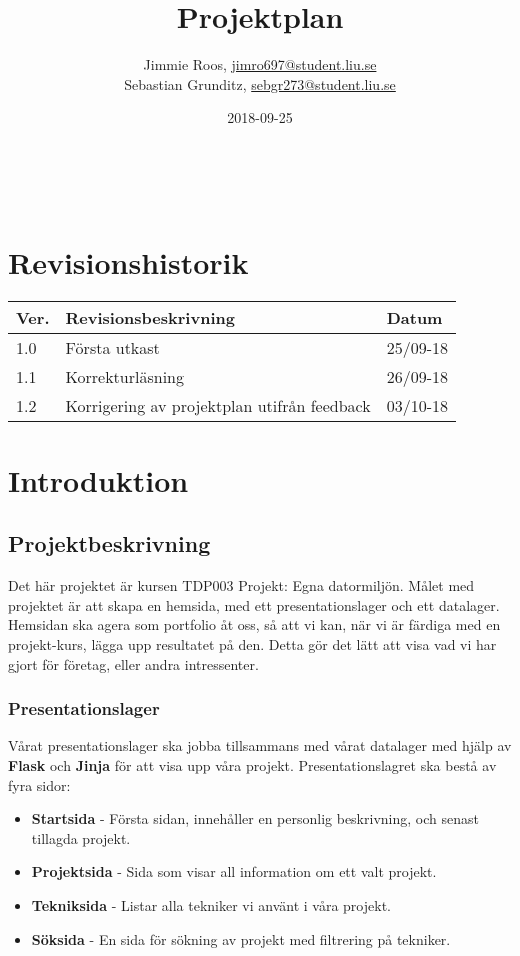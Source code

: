 \documentclass{TDP003mall}
\author{Jimmie Roos, \url{jimro697@student.liu.se}\\
Sebastian Grunditz, \url{sebgr273@student.liu.se}}
\title{Projektplan}
\date{2018-09-25}
\begin{document}
\projectpage
\tableofcontents
⁠
\thispagestyle{empty}
\newpage
{}
\section*{Revisionshistorik}
\begin{table}[!h]
\begin{tabularx}{\linewidth}{|l|X|l|}
\hline
Ver. & Revisionsbeskrivning & Datum \\\hline
1.0 & Första utkast & 25/09-18 \\\hline
1.1 & Korrekturläsning & 26/09-18 \\\hline
1.2 & Korrigering av projektplan utifrån feedback & 03/10-18 \\\hline
\end{tabularx}
\end{table}


\section{Introduktion}
\subsection{Projektbeskrivning}
Det här projektet är kursen TDP003 Projekt: Egna datormiljön. Målet med projektet är att skapa en hemsida, med ett presentationslager och ett datalager.
Hemsidan ska agera som portfolio åt oss, så att vi kan, när vi är färdiga med en projekt-kurs, lägga upp resultatet på den. Detta gör det lätt att visa vad vi har gjort för företag, eller andra intressenter.
\subsubsection{Presentationslager}
Vårat presentationslager ska jobba tillsammans med vårat datalager med hjälp av \textbf{Flask} och \textbf{Jinja} för att visa upp våra projekt.
Presentationslagret ska bestå av fyra sidor:
\begin{itemize}
    \item \textbf{Startsida} - Första sidan, innehåller en personlig beskrivning, och senast tillagda projekt.
    \item \textbf{Projektsida} - Sida som visar all information om ett valt projekt.
    \item \textbf{Tekniksida} - Listar alla tekniker vi använt i våra projekt.
    \item \textbf{Söksida} - En sida för sökning av projekt med filtrering på tekniker.
\end{itemize}
\end{document}
